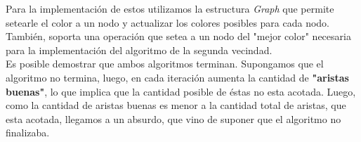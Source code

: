 Para la implementación de estos utilizamos la estructura \textit{Graph} que permite setearle el color a un nodo y actualizar los colores posibles para cada nodo. También, soporta una operación que setea a un nodo del "mejor color" necesaria para la implementación del algoritmo de la segunda vecindad. \\

Es posible demostrar que ambos algoritmos terminan. Supongamos que el algoritmo no termina, luego, en cada iteración aumenta la cantidad de \textbf{"aristas buenas"}, lo que implica que la cantidad  posible de éstas no esta acotada. Luego, como la cantidad de aristas buenas es menor a la  cantidad total de aristas, que esta acotada, llegamos a un absurdo, que vino de suponer que el algoritmo no finalizaba.\\

